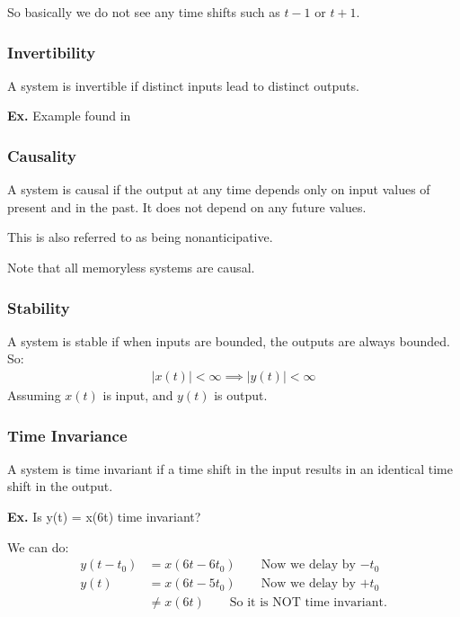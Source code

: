 \documentclass[12pt,letterpaper]{article} \usepackage{amsmath} \usepackage{graphicx} \usepackage[margin=1in]{geometry} \usepackage{longtable}  \usepackage{amssymb}
\begin{document}
	So basically we do not see any time shifts such as $t-1$ or $t+1$.
	
	\subsubsection{Invertibility}
	A system is invertible if distinct inputs lead to distinct outputs. 
	
	\begin{mdframed}
		\textbf{Ex.} Example found in 
	\end{mdframed}
	
	\subsubsection{Causality}
	A system is causal if the output at any time depends only on input values of present and in the past. It does not depend on any future values. 
	
	This is also referred to as being nonanticipative.
	
	Note that all memoryless systems are causal.
	
	\subsubsection{Stability}
	A system is stable if when inputs are bounded, the outputs are always bounded. So:
	\begin{align}
		|x(t)| < \infty \implies |y(t)| < \infty 
	\end{align}
	Assuming $x(t)$ is input, and $y(t)$ is output.
	
	\subsubsection{Time Invariance}
	A system is time invariant if a time shift in the input results in an identical time shift in the output. 
	
	\begin{mdframed}
		\textbf{Ex.} Is y(t) = x(6t) time invariant?
		
		We can do:
		\begin{align*}
			y(t-t_0) &= x(6t-6t_0) \qquad \text{Now we delay by $-t_0$}\\
			y(t) &= x(6t-5t_0)  \qquad \text{Now we delay by $+t_0$}\\
			&\ne x(6t) \qquad \text{So it is NOT time invariant.}
		\end{align*}
	\end{mdframed}
\end{document}

